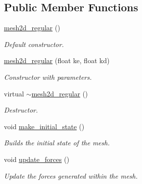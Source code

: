 \subsection*{Public Member Functions}
\begin{DoxyCompactItemize}
\item 
\mbox{\label{classphysim_1_1meshes_1_1mesh2d__regular_a2a8801b097cd6bccd6d6a088fa6f6d9f}} 
\hyperlink{classphysim_1_1meshes_1_1mesh2d__regular_a2a8801b097cd6bccd6d6a088fa6f6d9f}{mesh2d\+\_\+regular} ()
\begin{DoxyCompactList}\small\item\em Default constructor. \end{DoxyCompactList}\item 
\hyperlink{classphysim_1_1meshes_1_1mesh2d__regular_acaae970247d081125fc7c77368aafc07}{mesh2d\+\_\+regular} (float ke, float kd)
\begin{DoxyCompactList}\small\item\em Constructor with parameters. \end{DoxyCompactList}\item 
\mbox{\label{classphysim_1_1meshes_1_1mesh2d__regular_aa33cccd404aa92abb6bf1c654054da9d}} 
virtual \hyperlink{classphysim_1_1meshes_1_1mesh2d__regular_aa33cccd404aa92abb6bf1c654054da9d}{$\sim$mesh2d\+\_\+regular} ()
\begin{DoxyCompactList}\small\item\em Destructor. \end{DoxyCompactList}\item 
void \hyperlink{classphysim_1_1meshes_1_1mesh2d__regular_ab05d404566850dd5a2d11814c3c25186}{make\+\_\+initial\+\_\+state} ()
\begin{DoxyCompactList}\small\item\em Builds the initial state of the mesh. \end{DoxyCompactList}\item 
void \hyperlink{classphysim_1_1meshes_1_1mesh2d__regular_aaf4e82b9231d79624224c3462cc18809}{update\+\_\+forces} ()
\begin{DoxyCompactList}\small\item\em Update the forces generated within the mesh. \end{DoxyCompactList}\item 
\mbox{\label{classphysim_1_1meshes_1_1mesh2d__regular_a6881e0701bdbbaf06f0502edfa8baac8}} 

\end{DoxyCompactItemize}
